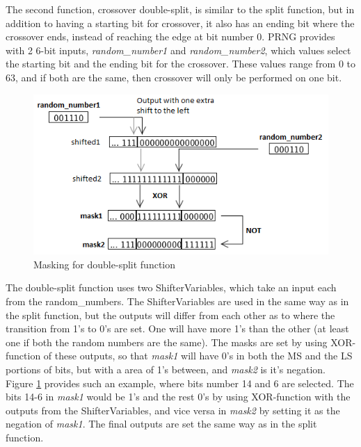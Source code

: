 The second function, crossover double-split, is similar to the split function, but in addition to having a starting bit for crossover, it also has an ending bit where the crossover ends, instead of reaching the edge at bit number 0.
PRNG provides with 2 6-bit inputs, \emph{random\_number1} and \emph{random\_number2}, which values select the starting bit and the ending bit for the crossover.
These values range from 0 to 63, and if both are the same, then crossover will only be performed on one bit.

\begin{figure}[H]
\includegraphics[width=\textwidth]{fpga/fig/crossover_doublesplit_mask2.png}
\caption{Masking for double-split function}
\label{fig_crossover_doublesplit_mask}
\end{figure}

The double-split function uses two ShifterVariables, which take an input each from the random\_numbers.
The ShifterVariables are used in the same way as in the split function, but the outputs will differ from each other as to where the transition from 1's to 0's are set.
One will have more 1's than the other (at least one if both the random numbers are the same).
The masks are set by using XOR-function of these outputs, so that \emph{mask1} will have 0's in both the MS and the LS portions of bits, but with a area of 1's between, and \emph{mask2} is it's negation.
Figure \ref{fig_crossover_doublesplit_mask} provides such an example, where bits number 14 and 6 are selected.
The bits 14-6 in \emph{mask1} would be 1's and the rest 0's by using XOR-function with the outputs from the ShifterVariables, and vice versa in \emph{mask2} by setting it as the negation of \emph{mask1}.
The final outputs are set the same way as in the split function.


